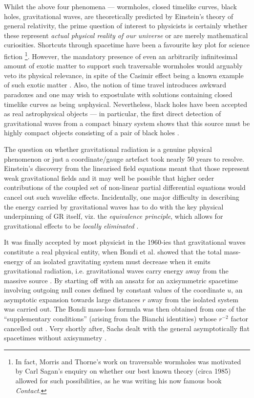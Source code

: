\documentclass[aps,pre,preprint,superscriptaddress,showpacs,showkeys]{revtex4-1}
\begin{document}
Whilst the above four phenomena --- wormholes, closed timelike curves, black holes, gravitational waves, are theoretically predicted by Einstein's theory of general relativity, the prime question of interest to physicists is certainly whether these represent \emph{actual physical reality of our universe} or are merely mathematical curiosities. Shortcuts through spacetime have been a favourite key plot for science fiction \footnote{In fact, Morris and Thorne's work on traversable wormholes \cite{Kip} was motivated by Carl Sagan's enquiry on whether our best known theory (circa 1985) allowed for such possibilities, as he was writing his now famous book \emph{Contact}.}. However, the mandatory presence of even an arbitrarily infinitesimal amount of exotic matter to support such traversable wormholes \cite{Vis2} would arguably veto its physical relevance, in spite of the Casimir effect being a known example of such exotic matter \cite{Exo1,Exo2,Exo3}. Also, the notion of time travel introduces awkward paradoxes and one may wish to expostulate with solutions containing closed timelike curves as being \emph{un}physical. Nevertheless, black holes have been accepted as real astrophysical objects --- in particular, the first direct detection of gravitational waves from a compact binary system shows that this source must be highly compact objects consisting of a pair of black holes \cite{LIGO}.

The question on whether gravitational radiation is a genuine physical phenomenon or just a coordinate/gauge artefact took nearly 50 years to resolve. Einstein's discovery from the linearised field equations meant that those represent weak gravitational fields and it may well be possible that higher order contributions of the coupled set of non-linear partial differential equations would cancel out such wavelike effects. Incidentally, one major difficulty in describing the energy carried by gravitational waves has to do with the key physical underpinning of GR itself, viz. the \emph{equivalence principle}, which allows for gravitational effects to be \emph{locally eliminated} \cite{Hobson}.

It was finally accepted by most physicist in the 1960-ies that gravitational waves constitute a real physical entity, when Bondi et al. showed that the total mass-energy of an isolated gravitating system must decrease when it emits gravitational radiation, i.e. gravitational waves carry energy away from the massive source \cite{Bondi60,Bondi62}. By starting off with an ansatz for an axisymmetric spacetime involving outgoing null cones defined by constant values of the coordinate $u$, an asymptotic expansion towards large distances $r$ away from the isolated system was carried out. The Bondi mass-loss formula was then obtained from one of the ``supplementary conditions'' (arising from the Bianchi identities) whose $r^{-2}$ factor cancelled out \cite{Bondi62}. Very shortly after, Sachs dealt with the general asymptotically flat spacetimes without axisymmetry \cite{Sachs62}.
\end{document}
